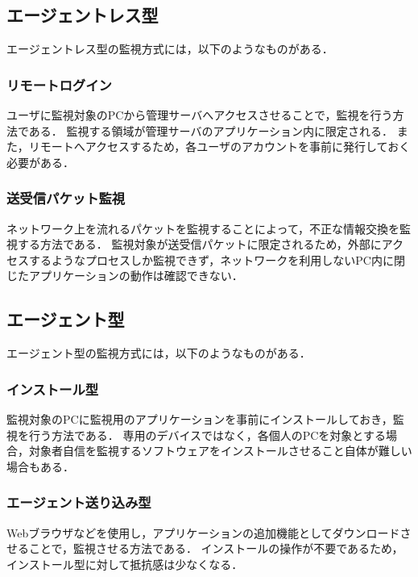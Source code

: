 \subsection{エージェントレス型}
エージェントレス型の監視方式には，以下のようなものがある．

\subsubsection{リモートログイン}
ユーザに監視対象のPCから管理サーバへアクセスさせることで，監視を行う方法である．
監視する領域が管理サーバのアプリケーション内に限定される．
また，リモートへアクセスするため，各ユーザのアカウントを事前に発行しておく必要がある．

\subsubsection{送受信パケット監視}
ネットワーク上を流れるパケットを監視することによって，不正な情報交換を監視する方法である．
監視対象が送受信パケットに限定されるため，外部にアクセスするようなプロセスしか監視できず，ネットワークを利用しないPC内に閉じたアプリケーションの動作は確認できない．

\subsection{エージェント型}
エージェント型の監視方式には，以下のようなものがある．

\subsubsection{インストール型}
監視対象のPCに監視用のアプリケーションを事前にインストールしておき，監視を行う方法である．
専用のデバイスではなく，各個人のPCを対象とする場合，対象者自信を監視するソフトウェアをインストールさせること自体が難しい場合もある．

\subsubsection{エージェント送り込み型}
Webブラウザなどを使用し，アプリケーションの追加機能としてダウンロードさせることで，監視させる方法である．
インストールの操作が不要であるため，インストール型に対して抵抗感は少なくなる．
